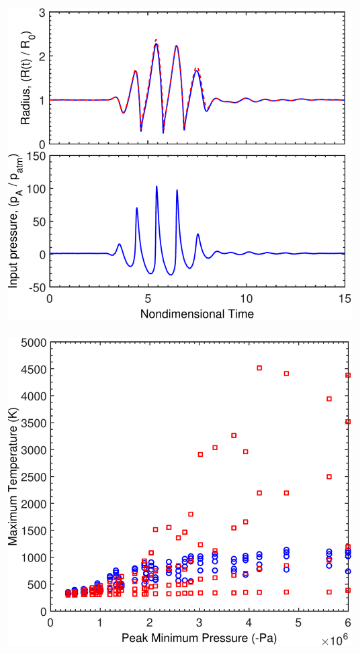 \begin{figure}[t]
  \centering
  \begin{subfigure}{0.47\textwidth}
    \includegraphics[width=\textwidth]{figs/bubble_figs/PFPair}
    \caption[History of the bubble radius for PFP and air]{}
    \label{fig:usbe_bubble_pfpair_radius}
  \end{subfigure}
  \begin{subfigure}{0.47\textwidth}
    \includegraphics[width=\textwidth]{figs/bubble_figs/TmaxPFPair}

\end{subfigure}
\end{figure}
